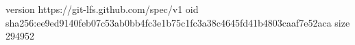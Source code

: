 version https://git-lfs.github.com/spec/v1
oid sha256:ee9ed9140feb07c53ab0bb4fc3e1b75c1fc3a38c4645fd41b4803caaf7e52aca
size 294952
